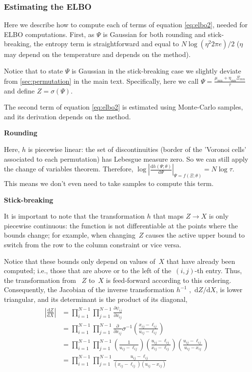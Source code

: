 \documentclass[twoside]{article}
\begin{document}
\subsubsection*{Estimating the ELBO} 
Here we describe how to compute each of terms of equation \eqref{eq:elbo2}, needed for ELBO computations. First, as $\Psi$ is Gaussian for both rounding and stick-breaking, the entropy term is straightforward and equal to $N\log(\eta^2 2\pi e )/2$ ($\eta$ may depend on the temperature and depends on the method). 

Notice that to state $\Psi$ is Gaussian in the stick-breaking case we slightly deviate from \ref{sec:permutation} in the main text. Specifically, here we call $\Psi=\frac{\mu_{mn} + \eta_{mn} \Xi_{mn}}{\tau} $ and define $Z = \sigma(\Psi)$.

The second term of equation \eqref{eq:elbo2} is estimated using Monte-Carlo samples, and its derivation depends on the method. 

\textbf{Rounding}

Here, $h$ is piecewise linear: the set of discontinuities (border of the 'Voronoi cells' associated to each permutation) has Lebesgue measure zero. So we can still apply the change of variables theorem. Therefore, 
$\log \left| \frac{\mathrm{d}h(\Psi; \theta)}{\mathrm{d}\Psi} \right|_{\Psi = f(\Xi; \theta)}= N\log
\tau$. This means we don't even need to take samples to compute this term.


\textbf{Stick-breaking}

It is important to note that the transformation $h$ that maps $Z\rightarrow X$ is only piecewise
continuous: the function is not differentiable at the points where
the bounds change; for example, when changing~$Z$ causes the
active upper bound to switch from the row to the column constraint
or vice versa.  

Notice that these bounds only depend on values of~$X$ that
have already been computed; i.e., those that are above or to the left of
the~$(i,j)$-th entry. Thus, the transformation from ~$Z$ to~$X$
is feed-forward according to this ordering.  Consequently, the
Jacobian of the inverse transformation $h^{-1}$ ,~$\mathrm{d}Z / \mathrm{d} X$,
is lower triangular, and its determinant is the product of its diagonal,
\begin{align}
\nonumber \left| \frac{\mathrm{d} Z} {\mathrm{d} X} \right|
&= \prod_{i=1}^{N-1} \prod_{j=1}^{N-1} \frac{\partial \psi_{ij} }{\partial {x}_{ij}} \\
\nonumber &= \prod_{i=1}^{N-1} \prod_{j=1}^{N-1} \frac{\partial}{\partial {x}_{ij}}
\sigma^{-1} \left( \frac{{x}_{ij} - \ell_{ij}}{u_{ij} - \ell_{ij}} \right ) \\
\nonumber &= \prod_{i=1}^{N-1} \prod_{j=1}^{N-1}
\left( \frac{1}{u_{ij} - \ell_{ij}} \right )
\left( \frac{u_{ij} - \ell_{ij}}{{x}_{ij} - \ell_{ij}} \right )
\left( \frac{u_{ij} - \ell_{ij}}{u_{ij} - {x}_{ij}} \right ) \\
\nonumber &= \prod_{i=1}^{N-1} \prod_{j=1}^{N-1}
\frac{u_{ij} - \ell_{ij}}{({x}_{ij} - \ell_{ij}) (u_{ij} - {x}_{ij})}
\end{align}
\end{document}
